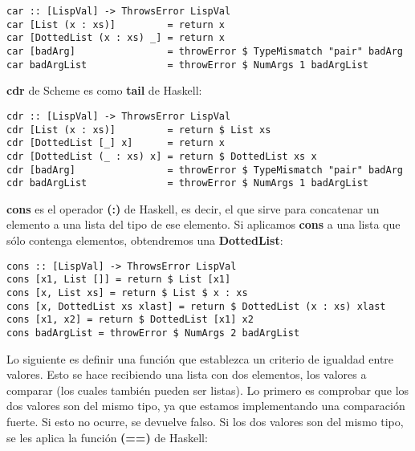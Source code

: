 \begin{minipage}{\linewidth}
\begin{footnotesize}
\begin{lstlisting}[frame=single]
car :: [LispVal] -> ThrowsError LispVal
car [List (x : xs)]         = return x
car [DottedList (x : xs) _] = return x
car [badArg]                = throwError $ TypeMismatch "pair" badArg
car badArgList              = throwError $ NumArgs 1 badArgList
\end{lstlisting}
\end{footnotesize}
\end{minipage}

\textbf{cdr} de Scheme es  como \textbf{tail} de Haskell:\\

\begin{minipage}{\linewidth}
\begin{footnotesize}
\begin{lstlisting}[frame=single]
cdr :: [LispVal] -> ThrowsError LispVal
cdr [List (x : xs)]         = return $ List xs
cdr [DottedList [_] x]      = return x
cdr [DottedList (_ : xs) x] = return $ DottedList xs x
cdr [badArg]                = throwError $ TypeMismatch "pair" badArg
cdr badArgList              = throwError $ NumArgs 1 badArgList
\end{lstlisting}
\end{footnotesize}
\end{minipage}

\textbf{cons} es el operador \textbf{(:)} de Haskell, es decir, el que sirve para concatenar un elemento a una lista del tipo de ese elemento. Si aplicamos \textbf{cons} a una lista que s\'olo contenga elementos, obtendremos una \textbf{DottedList}:\\

\begin{minipage}{\linewidth}
\begin{footnotesize}
\begin{lstlisting}[frame=single]
cons :: [LispVal] -> ThrowsError LispVal
cons [x1, List []] = return $ List [x1]
cons [x, List xs] = return $ List $ x : xs
cons [x, DottedList xs xlast] = return $ DottedList (x : xs) xlast
cons [x1, x2] = return $ DottedList [x1] x2
cons badArgList = throwError $ NumArgs 2 badArgList
\end{lstlisting}
\end{footnotesize}
\end{minipage}

Lo siguiente es definir una funci\'on que establezca un criterio de igualdad entre valores. Esto se hace recibiendo una lista con dos elementos, los valores a comparar (los cuales tambi\'en pueden ser listas). Lo primero es comprobar que los dos valores son del mismo tipo, ya que estamos implementando una comparaci\'on fuerte. Si esto no ocurre, se devuelve falso. Si los dos valores son del mismo tipo, se les aplica la funci\'on \textbf{(==)} de Haskell:

